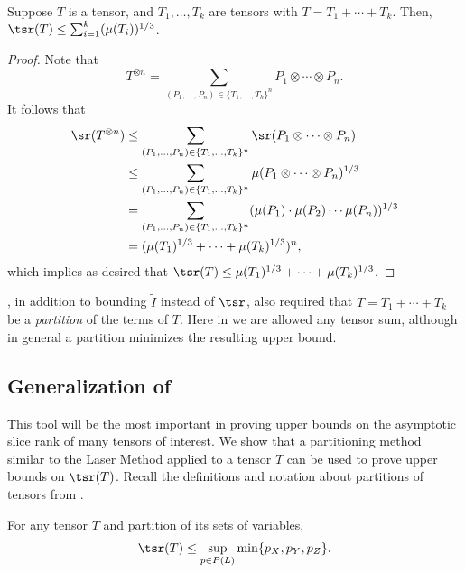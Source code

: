 \documentclass{toc}
\begin{document}
\begin{theorem} \label{one}
Suppose $T$ is a tensor, and $T_1, \ldots, T_k$ are tensors with $T = T_1 + \cdots + T_k$. Then, $\tsr(T) \leq \sum_{i=1}^k (\mu(T_i))^{1/3}$.
\end{theorem}

\begin{proof}
Note that
$$T^{\otimes n} = \sum_{(P_1, \ldots, P_n) \in \{ T_1, \ldots, T_k\}^n} P_1 \otimes \cdots \otimes P_n.$$
It follows that
\begin{align*}\sr(T^{\otimes n}) &\leq \sum_{(P_1, \ldots, P_n) \in \{ T_1, \ldots, T_k\}^n} \sr(P_1 \otimes \cdots \otimes P_n) \\&\leq \sum_{(P_1, \ldots, P_n) \in \{ T_1, \ldots, T_k\}^n} \mu(P_1 \otimes \cdots \otimes P_n)^{1/3} \\&= \sum_{(P_1, \ldots, P_n) \in \{ T_1, \ldots, T_k\}^n} (\mu(P_1) \cdot \mu(P_2) \cdots \mu(P_n))^{1/3} \\&= (\mu(T_1)^{1/3} + \cdots + \mu(T_k)^{1/3})^{n},\end{align*}
which implies as desired that $\tsr(T) \leq \mu(T_1)^{1/3} + \cdots + \mu(T_k)^{1/3}$.
\end{proof}

\begin{remark}
\cite[Theorem~5.3]{aw}, in addition to bounding $\tilde{I}$ instead of $\tsr$, also required that $T = T_1 + \cdots + T_k$ be a \emph{partition} of the terms of $T$. Here in  we are allowed any tensor sum, although in general a partition minimizes the resulting upper bound.
\end{remark}

%

\subsection{Generalization of \cite[Theorem~5.2]{aw}} \label{subsectwo}

This tool will be the most important in
%
proving upper bounds on  %
the asymptotic slice rank of many tensors of interest. We show that a partitioning method similar to the Laser Method applied to a tensor $T$ can be used to prove upper bounds on $\tsr(T)$. Recall the definitions and notation about partitions of tensors from .

\begin{theorem} \label{two} For any tensor $T$ and partition of its  
%
sets of variables,
$$\tsr(T) \leq \sup_{p \in P(L)} \min\{ p_X, p_Y, p_Z \}.$$
\end{theorem}
\end{document}
